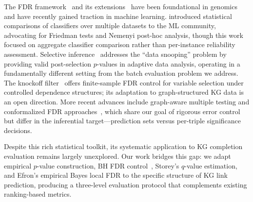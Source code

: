 The FDR framework~\cite{benjamini1995controlling} and its extensions~\cite{storey2002direct,storey2003statistical,efron2004large,efron2007size} have been foundational in genomics and have recently gained traction in machine learning.
\cite{demsar2006statistical} introduced statistical comparisons of classifiers over multiple datasets to the ML community, advocating for Friedman tests and Nemenyi post-hoc analysis, though this work focused on aggregate classifier comparison rather than per-instance reliability assessment.
Selective inference~\cite{taylor2015statistical,lee2016exact} addresses the ``data snooping'' problem by providing valid post-selection $p$-values in adaptive data analysis, operating in a fundamentally different setting from the batch evaluation problem we address.
The knockoff filter~\cite{barber2015controlling,candes2018panning} offers finite-sample FDR control for variable selection under controlled dependence structures; its adaptation to graph-structured KG data is an open direction.
More recent advances include graph-aware multiple testing and conformalized FDR approaches~\cite{angelopoulos2023conformal,angelopoulos2024prediction,bates2024cross,marandon2024fdr}, which share our goal of rigorous error control but differ in the inferential target---prediction sets versus per-triple significance decisions.

Despite this rich statistical toolkit, its systematic application to KG completion evaluation remains largely unexplored.
Our work bridges this gap: we adapt empirical $p$-value construction, BH FDR control~\cite{benjamini1995controlling,benjamini2001control}, Storey's $q$-value estimation, and Efron's empirical Bayes local FDR to the specific structure of KG link prediction, producing a three-level evaluation protocol that complements existing ranking-based metrics.
